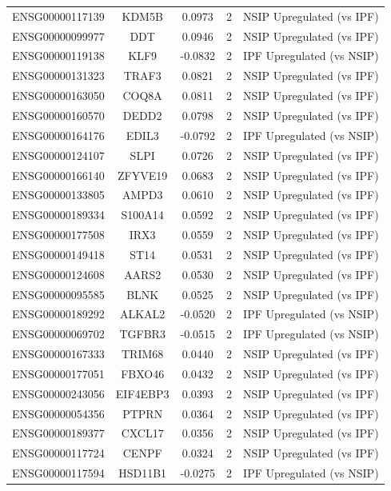 \documentclass[
]{article}
\begin{document}
\begin{singlespace}
\begin{longtable}[t]{lcccl}
ENSG00000117139 & KDM5B & 0.0973 & 2 & NSIP Upregulated (vs IPF)\\
\addlinespace
ENSG00000099977 & DDT & 0.0946 & 2 & NSIP Upregulated (vs IPF)\\
ENSG00000119138 & KLF9 & -0.0832 & 2 & IPF Upregulated (vs NSIP)\\
ENSG00000131323 & TRAF3 & 0.0821 & 2 & NSIP Upregulated (vs IPF)\\
ENSG00000163050 & COQ8A & 0.0811 & 2 & NSIP Upregulated (vs IPF)\\
ENSG00000160570 & DEDD2 & 0.0798 & 2 & NSIP Upregulated (vs IPF)\\
\addlinespace
ENSG00000164176 & EDIL3 & -0.0792 & 2 & IPF Upregulated (vs NSIP)\\
ENSG00000124107 & SLPI & 0.0726 & 2 & NSIP Upregulated (vs IPF)\\
ENSG00000166140 & ZFYVE19 & 0.0683 & 2 & NSIP Upregulated (vs IPF)\\
ENSG00000133805 & AMPD3 & 0.0610 & 2 & NSIP Upregulated (vs IPF)\\
ENSG00000189334 & S100A14 & 0.0592 & 2 & NSIP Upregulated (vs IPF)\\
\addlinespace
ENSG00000177508 & IRX3 & 0.0559 & 2 & NSIP Upregulated (vs IPF)\\
ENSG00000149418 & ST14 & 0.0531 & 2 & NSIP Upregulated (vs IPF)\\
ENSG00000124608 & AARS2 & 0.0530 & 2 & NSIP Upregulated (vs IPF)\\
ENSG00000095585 & BLNK & 0.0525 & 2 & NSIP Upregulated (vs IPF)\\
ENSG00000189292 & ALKAL2 & -0.0520 & 2 & IPF Upregulated (vs NSIP)\\
\addlinespace
ENSG00000069702 & TGFBR3 & -0.0515 & 2 & IPF Upregulated (vs NSIP)\\
ENSG00000167333 & TRIM68 & 0.0440 & 2 & NSIP Upregulated (vs IPF)\\
ENSG00000177051 & FBXO46 & 0.0432 & 2 & NSIP Upregulated (vs IPF)\\
ENSG00000243056 & EIF4EBP3 & 0.0393 & 2 & NSIP Upregulated (vs IPF)\\
ENSG00000054356 & PTPRN & 0.0364 & 2 & NSIP Upregulated (vs IPF)\\
\addlinespace
ENSG00000189377 & CXCL17 & 0.0356 & 2 & NSIP Upregulated (vs IPF)\\
ENSG00000117724 & CENPF & 0.0324 & 2 & NSIP Upregulated (vs IPF)\\
ENSG00000117594 & HSD11B1 & -0.0275 & 2 & IPF Upregulated (vs NSIP)\\

\end{longtable}
\end{singlespace}
\end{document}
